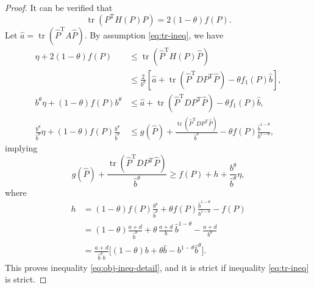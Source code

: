 \documentclass[10pt,a4paper]{amsart}
\def\newgamma{h}
\def\newbeta{b}
\def\newdelta{d}
\def\newalpha{a}
\DeclareMathOperator{\T}{T}
\DeclareMathOperator{\tr}{tr}
\def\what{\widehat}
\begin{document}
\begin{proof}
It can be verified that
$$
\tr ( P^{\T} H(P) P)
            =2(1-\theta)f(P).
$$
Let $\hat\newalpha=\tr (\what P^{\T}A\what P)$.
By assumption \eqref{eq:tr-ineq}, we have
\begin{align}
\eta+2(1-\theta)f(P)&\le\tr(\what P^{\T} H(P)\what P) \nonumber\\
   &\le \frac 2{\newbeta^{\theta}}[\hat\newalpha+\tr(\what P^{\T} DP^{\T}\what P)-\theta f_1(P)\hat\newbeta],\nonumber \\
\newbeta^{\theta}\eta+(1-\theta)f(P)\newbeta^{\theta}
   &\le\hat\newalpha+\tr(\what P^{\T} DP^{\T}\what P)-\theta f_1(P)\hat\newbeta,\nonumber \\
\frac {\newbeta^{\theta}}{\hat\newbeta^{\theta}}\eta+(1-\theta)f(P)\frac {\newbeta^{\theta}}{\hat\newbeta^{\theta}}
   &\le g(\what P)
       +\frac {\tr(\what P^{\T} DP^{\T}\what P)}{\hat\newbeta^{\theta}}-\theta  f(P)\frac {\hat\newbeta^{1-\theta}}{\newbeta^{1-\theta}}, \nonumber%
\end{align}
implying
$$
g(\what P)+\frac {\tr(\what P^{\T} DP^{\T}\what P)}{\hat\newbeta^{\theta}}
  \ge f( P)+\newgamma+\frac {\newbeta^{\theta}}{\hat\newbeta^{\theta}}\eta,
$$
where
\begin{align}
\newgamma&=(1-\theta)f(P)\frac {\newbeta^{\theta}}{\hat\newbeta^{\theta}}
           +\theta  f(P)\frac {\hat\newbeta^{1-\theta}}{\newbeta^{1-\theta}}-f(P) \nonumber \\
  &=(1-\theta)\frac {\newalpha+\newdelta}{\hat\newbeta^{\theta}}
           +\theta\, \frac {\newalpha+\newdelta}{\newbeta}\,\hat\newbeta^{1-\theta}-\frac {\newalpha+\newdelta}{\newbeta^{\theta}} \nonumber \\
  &=\frac {\newalpha+\newdelta}{\hat\newbeta^{\theta}\newbeta}
    \Big[(1-\theta)\newbeta+\theta\hat\newbeta-\newbeta^{1-\theta}\hat\newbeta^{\theta}\Big]. \nonumber
\end{align}
This proves  inequality  \eqref{eq:obj-ineq-detail}, and it is strict if inequality \eqref{eq:tr-ineq} is strict.
\end{proof}
\end{document}
